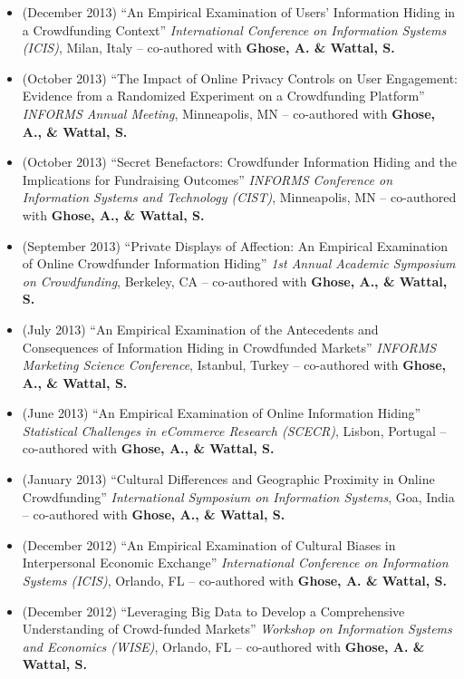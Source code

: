 \documentclass[10.5pt,letterpaper,sans]{moderncv}        %
\begin{document}
\begin{itemize}
\item (December 2013) ``An Empirical Examination of Users' Information Hiding in a Crowdfunding Context'' \textit{International Conference on Information Systems (ICIS)}, Milan, Italy -- co-authored with \textbf{Ghose, A. \& Wattal, S.}

\item (October 2013) ``The Impact of Online Privacy Controls on User Engagement: Evidence from a Randomized Experiment on a Crowdfunding Platform'' \textit{INFORMS Annual Meeting}, Minneapolis, MN -- co-authored with \textbf{Ghose, A., \& Wattal, S.}

\item (October 2013) ``Secret Benefactors: Crowdfunder Information Hiding and the Implications for Fundraising Outcomes'' \textit{INFORMS Conference on Information Systems and Technology (CIST)}, Minneapolis, MN -- co-authored with \textbf{Ghose, A., \& Wattal, S.}

\item (September 2013) ``Private Displays of Affection: An Empirical Examination of Online Crowdfunder Information Hiding'' \textit{1st Annual Academic Symposium on Crowdfunding}, Berkeley, CA -- co-authored with \textbf{Ghose, A., \& Wattal, S.}

\item (July 2013) ``An Empirical Examination of the Antecedents and Consequences of Information Hiding in Crowdfunded Markets'' \textit{INFORMS Marketing Science Conference}, Istanbul, Turkey -- co-authored with \textbf{Ghose, A., \& Wattal, S.}

\item (June 2013) ``An Empirical Examination of Online Information Hiding'' \textit{Statistical Challenges in eCommerce Research (SCECR)}, Lisbon, Portugal -- co-authored with \textbf{Ghose, A., \& Wattal, S.}

\item (January 2013) ``Cultural Differences and Geographic Proximity in Online Crowdfunding'' \textit{International Symposium on Information Systems}, Goa, India -- co-authored with \textbf{Ghose, A., \& Wattal, S.}

\item (December 2012) ``An Empirical Examination of Cultural Biases in Interpersonal Economic Exchange'' \textit{International Conference on Information Systems (ICIS)}, Orlando, FL -- co-authored with \textbf{Ghose, A. \& Wattal, S.}

\item (December 2012) ``Leveraging Big Data to Develop a Comprehensive Understanding of Crowd-funded Markets'' \textit{Workshop on Information Systems and Economics (WISE)}, Orlando, FL -- co-authored with \textbf{Ghose, A. \& Wattal, S.}


\end{itemize}
\end{document}
